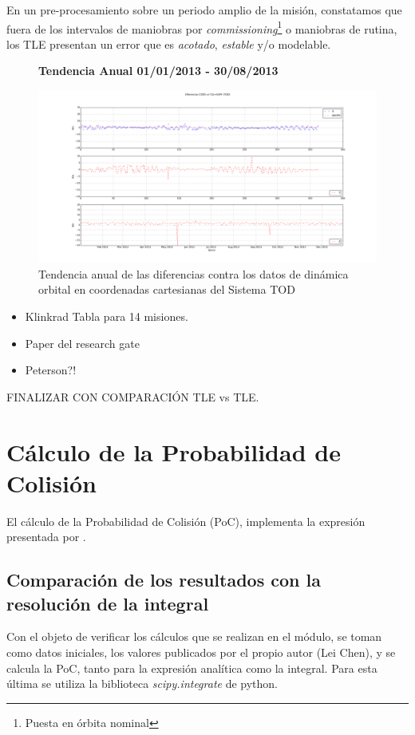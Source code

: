 En un pre-procesamiento sobre un periodo amplio de la misi\'on, constatamos que fuera de los intervalos de maniobras por {\it{commissioning}}\footnote{Puesta en \'orbita nominal} o maniobras de rutina, los TLE presentan un error que es {\it{acotado}}, {\it{estable}} y/o modelable.  

\begin{figure}[!h]
\centering
  \textbf{Tendencia Anual 01/01/2013 - 30/08/2013}\par\medskip
  \includegraphics[width=\textwidth]{imagenes/SACD2013todEjesajustados}
  \caption{Tendencia anual de las diferencias contra los datos de din\'amica orbital en coordenadas cartesianas del Sistema TOD}
\end{figure}

\begin{itemize}
 \item Klinkrad Tabla para 14 misiones.
 \item Paper del research gate
 \item Peterson?!
\end{itemize}

FINALIZAR CON COMPARACI\'ON TLE vs TLE. 



\section{C\'alculo de la Probabilidad de Colisi\'on}

El c\'alculo de la Probabilidad de Colisi\'on (PoC), implementa la expresi\'on presentada por  \cite[Lei Chen]{leichen}.


\subsection*{Comparaci\'on de los resultados con la resoluci\'on de la integral}
Con el objeto de verificar los c\'alculos que se realizan en el m\'odulo, se toman como datos iniciales, los valores publicados por el propio autor (Lei Chen), y se calcula la PoC, tanto para la expresi\'on anal\'itica como la integral. Para esta \'ultima se utiliza la biblioteca {\it{scipy.integrate}}  de python.

